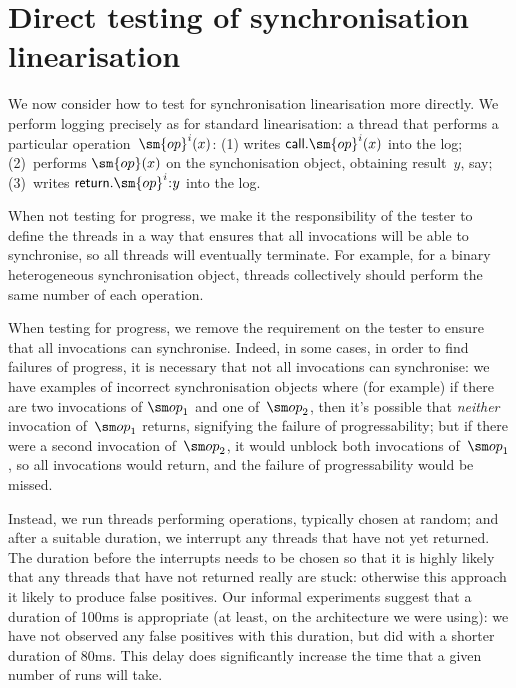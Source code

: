 \section{Direct testing of synchronisation linearisation}
\label{sec:direct}

We now consider how to test for synchronisation linearisation more directly.
We perform logging precisely as for standard linearisation: a thread that
performs a particular operation~$\sm{op}^i(x)$: (1) writes
$\call.\sm{op}^i(x)$ into the log; (2)~performs $\sm{op}(x)$ on the
synchonisation object, obtaining result~$y$, say; (3)~writes
$\return.\sm{op}^i \:: y$ into the log.  

When not testing for progress, we make it the responsibility of the tester to
define the threads in a way that ensures that all invocations will be able to
synchronise, so all threads will eventually terminate.  For example, for a
binary heterogeneous synchronisation object, threads collectively should
perform the same number of each operation. 

When testing for progress, we remove the requirement on the tester to ensure
that all invocations can synchronise.  Indeed, in some cases, in order to find
failures of progress, it is necessary that not all invocations can
synchronise: we have examples of incorrect synchronisation objects where (for
example) if there are two invocations of $\op_1$ and one of~$\op_2$, then it's
possible that \emph{neither} invocation of~$\op_1$ returns, signifying the
failure of progressability; but if there were a second invocation of~$\op_2$,
it would unblock both invocations of~$\op_1$, so all invocations would return,
and the failure of progressability would be missed.

Instead, we run threads performing operations, typically chosen at random; and
after a suitable duration, we interrupt any threads that have not yet
returned.  The duration before the interrupts needs to be chosen so that it is
highly likely that any threads that have not returned really are stuck:
otherwise this approach it likely to produce false positives.  Our informal
experiments suggest that a duration of 100ms is appropriate (at least, on the
architecture we were using): we have not observed any false positives with
this duration, but did with a shorter duration of 80ms.  This delay does
significantly increase the time that a given number of runs will take.


